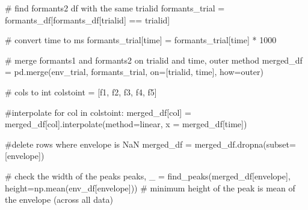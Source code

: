 \documentclass[
  letterpaper,
  DIV=11,
  numbers=noendperiod]{scrreprt}
\newenvironment{Shaded}{\begin{snugshade}}{\end{snugshade}}
\newcommand{\CommentTok}[1]{\textcolor[rgb]{0.37,0.37,0.37}{#1}}
\newcommand{\ControlFlowTok}[1]{\textcolor[rgb]{0.00,0.23,0.31}{#1}}
\newcommand{\DecValTok}[1]{\textcolor[rgb]{0.68,0.00,0.00}{#1}}
\newcommand{\KeywordTok}[1]{\textcolor[rgb]{0.00,0.23,0.31}{#1}}
\newcommand{\NormalTok}[1]{\textcolor[rgb]{0.00,0.23,0.31}{#1}}
\newcommand{\OperatorTok}[1]{\textcolor[rgb]{0.37,0.37,0.37}{#1}}
\newcommand{\StringTok}[1]{\textcolor[rgb]{0.13,0.47,0.30}{#1}}
\begin{document}
\begin{Shaded}
\begin{Highlighting}[]
\CommentTok{\# find formants2 df with the same trialid}
\NormalTok{formants\_trial }\OperatorTok{=}\NormalTok{ formants\_df[formants\_df[}\StringTok{\textquotesingle{}trialid\textquotesingle{}}\NormalTok{] }\OperatorTok{==}\NormalTok{ trialid]}

\CommentTok{\# convert time to ms}
\NormalTok{formants\_trial[}\StringTok{\textquotesingle{}time\textquotesingle{}}\NormalTok{] }\OperatorTok{=}\NormalTok{ formants\_trial[}\StringTok{\textquotesingle{}time\textquotesingle{}}\NormalTok{] }\OperatorTok{*} \DecValTok{1000}

\CommentTok{\# merge formants1 and formants2 on trialid and time, outer method}
\NormalTok{merged\_df }\OperatorTok{=}\NormalTok{ pd.merge(env\_trial, formants\_trial, on}\OperatorTok{=}\NormalTok{[}\StringTok{\textquotesingle{}trialid\textquotesingle{}}\NormalTok{, }\StringTok{\textquotesingle{}time\textquotesingle{}}\NormalTok{], how}\OperatorTok{=}\StringTok{\textquotesingle{}outer\textquotesingle{}}\NormalTok{)}

\CommentTok{\# cols to int}
\NormalTok{colstoint }\OperatorTok{=}\NormalTok{ [}\StringTok{\textquotesingle{}f1\textquotesingle{}}\NormalTok{, }\StringTok{\textquotesingle{}f2\textquotesingle{}}\NormalTok{, }\StringTok{\textquotesingle{}f3\textquotesingle{}}\NormalTok{, }\StringTok{\textquotesingle{}f4\textquotesingle{}}\NormalTok{, }\StringTok{\textquotesingle{}f5\textquotesingle{}}\NormalTok{]}

\CommentTok{\#interpolate }
\ControlFlowTok{for}\NormalTok{ col }\KeywordTok{in}\NormalTok{ colstoint:}
\NormalTok{    merged\_df[col] }\OperatorTok{=}\NormalTok{ merged\_df[col].interpolate(method}\OperatorTok{=}\StringTok{\textquotesingle{}linear\textquotesingle{}}\NormalTok{, x }\OperatorTok{=}\NormalTok{ merged\_df[}\StringTok{\textquotesingle{}time\textquotesingle{}}\NormalTok{])}

\CommentTok{\#delete rows where envelope is NaN}
\NormalTok{merged\_df }\OperatorTok{=}\NormalTok{ merged\_df.dropna(subset}\OperatorTok{=}\NormalTok{[}\StringTok{\textquotesingle{}envelope\textquotesingle{}}\NormalTok{])}

\CommentTok{\# check the width of the peaks}
\NormalTok{peaks, \_ }\OperatorTok{=}\NormalTok{ find\_peaks(merged\_df[}\StringTok{\textquotesingle{}envelope\textquotesingle{}}\NormalTok{], height}\OperatorTok{=}\NormalTok{np.mean(env\_df[}\StringTok{\textquotesingle{}envelope\textquotesingle{}}\NormalTok{])) }\CommentTok{\# minimum height of the peak is mean of the envelope (across all data)}


\end{Highlighting}
\end{Shaded}
\end{document}
